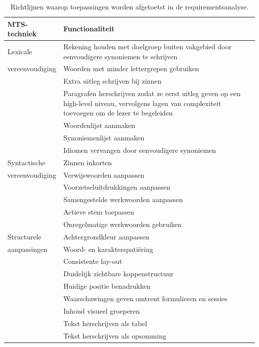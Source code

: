 \begin{center}
	\begin{table}[H]
		\begin{tabular}{ | m{4cm} | m{11cm} | } 
			\hline
			\textbf{MTS-techniek} & \textbf{Functionaliteit} \\
			\hline
			Lexicale & Rekening houden met doelgroep buiten vakgebied door eenvoudigere synoniemen te schrijven \\
			vereenvoudiging & Woorden met minder lettergrepen gebruiken \\
			& Extra uitleg schrijven bij zinnen \\
			& Paragrafen herschrijven zodat ze eerst uitleg geven op een high-level niveau, vervolgens lagen van complexiteit toevoegen om de lezer te begeleiden \\
			& Woordenlijst aanmaken \\
			& Synoniemenlijst aanmaken \\
			& Idiomen vervangen door eenvoudigere synoniemen \\
			\hline
			Syntactische & Zinnen inkorten \\
			vereenvoudiging & Verwijswoorden aanpassen \\
			& Voorzetseluitdrukkingen aanpassen \\
			& Samengestelde werkwoorden aanpassen \\
			& Actieve stem toepassen \\
			& Onregelmatige werkwoorden gebruiken \\
			\hline
			Structurele & Achtergrondkleur aanpassen \\
			aanpassingen & Woord- en karakterspatiëring \\
			& Consistente lay-out \\
			& Duidelijk zichtbare koppenstructuur \\
			& Huidige positie benadrukken \\
			& Waarschuwingen geven omtrent formulieren en sessies \\
			& Inhoud visueel groeperen \\
			& Tekst herschrijven als tabel \\
			& Tekst herschrijven als opsomming \\
			\hline
		\end{tabular}
		\caption{Richtlijnen waarop toepassingen worden afgetoetst in de requirementsanalyse.}
		\label{table:criteria-requirementsanalysis}	
	\end{table}
\end{center}

